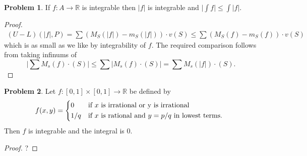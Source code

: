 \documentclass[20pt]{article}
\theoremstyle{plain}
\theoremstyle{definition}
\newtheorem*{problem}{Problem}
\newcommand{\reals}{\mathbb{R}}
\begin{document}
\begin{problem}
  If $f: A \to \reals$ is integrable then $|f|$ is integrable and
  $\big | \int f \big | \leq \int |f|.$
\end{problem}

\begin{proof}
  \begin{align*}
    (U-L)(|f|, P) = \sum (M_S(|f|) - m_S(|f|))\cdot v(S) 
    \leq \sum (M_S(f) - m_S(f))\cdot v(S)
  \end{align*}
  which is as small as we like by integrability of $f$. The required comparison
  follows from taking infinums of
  $$\big | \sum M_s(f) \cdot(S) \big |  \leq 
  \sum |M_s(f) \cdot(S)| = 
  \sum M_s(|f|) \cdot(S).$$ 
\end{proof}

\begin{problem}{3.7}
  Let $f: [0, 1]\times[0,1] \to \reals$ be defined by 
   \begin{equation*}
    f(x, y) =
    \begin{cases*}
      0 & if $x$ is irrational or y is irrational \\
      1/q & if $x$ is rational and $y=p/q$ in lowest terms.
    \end{cases*}
  \end{equation*}
  Then $f$ is integrable and the integral is $0.$
\end{problem}


\begin{proof}
  \color{ForestGreen}?
\end{proof}
\end{document}
